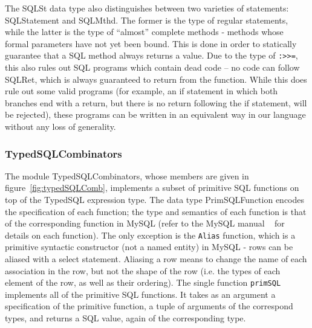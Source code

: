 The SQLSt data type also distinguishes between two varieties of statements:
SQLStatement and SQLMthd. The former is the type of regular statements, 
while the latter is the type of ``almost'' complete methods - methods whose 
formal parameters have not yet been bound. This is done in order to statically
guarantee that a SQL method always returns a value. Due to the type of
\lstinline{:>>=}, this also rules out SQL programs which contain dead code -- no
code can follow SQLRet, which is always guaranteed to return from the 
function.
While this does rule out some valid programs (for example, an if statement 
in
which both branches end with a return, but there is no return following the 
if
statement, will be rejected), these programs can be written in an equivalent
way in our language without any loss of generality.    

\subsubsection{TypedSQLCombinators}

The module TypedSQLCombinators, whose members are given in 
figure~\ref{fig:typedSQLComb},
implements a subset of primitive SQL functions on top of the TypedSQL 
expression type. 
The data type PrimSQLFunction encodes the specification of each 
function; the type
and semantics of each function is that of the corresponding function in 
MySQL (refer to
the MySQL manual ~\cite{mySQLman} for details on each function). The 
only exception
is the \lstinline{Alias} function, which is a primitive syntactic 
constructor (not a named entity)
in MySQL - rows can be aliased with a select statement. Aliasing a row 
means to change
the name of each association in the row, but not the shape of the row 
(i.e. the types of
each element of the row, as well as their ordering). The single 
function \lstinline{primSQL}
implements all of the primitive SQL functions. It takes as an argument 
a specification
of the primitive function, a tuple of arguments of the correspond 
types, and returns
a SQL value, again of the corresponding type. 

